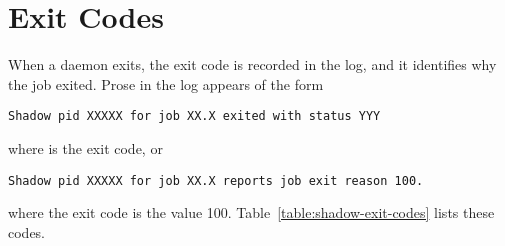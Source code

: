 \section{ Exit Codes}
When a  daemon exits, 
the  exit code is recorded in the  log,
and it identifies why the job exited. 
Prose in the log appears of the form
\begin{verbatim}
Shadow pid XXXXX for job XX.X exited with status YYY 
\end{verbatim}
where  is the exit code,  or
\begin{verbatim}
Shadow pid XXXXX for job XX.X reports job exit reason 100. 
\end{verbatim}
where the exit code is the value 100.
Table~\ref{table:shadow-exit-codes} lists these codes.


